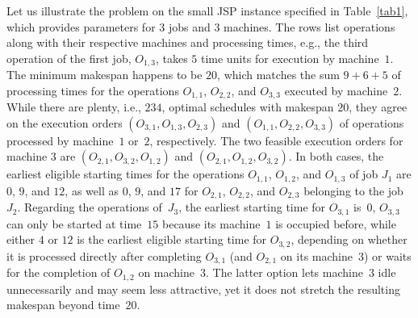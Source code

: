 \documentclass[runningheads]{llncs}
\begin{document}
Let us illustrate the problem on the small JSP instance specified in Table~\ref{tab1}, which provides parameters for $3$ jobs and $3$ machines. 
The rows list operations along with their respective machines and processing times, e.g., the third operation of the first job, $O_{1,3}$, takes $5$ time units for execution by machine~$1$.
The minimum makespan happens to be $20$, which matches the sum $9+6+5$ of processing times for the operations $O_{1,1}$, $O_{2,2}$, and $O_{3,3}$ executed by machine~$2$.
While there are plenty, i.e., $234$, optimal schedules with makespan $20$,
they agree on the execution orders $(O_{3,1}, O_{1,3}, O_{2,3})$ and $(O_{1,1}, O_{2,2}, O_{3,3})$
of operations processed by machine~$1$ or~$2$, respectively.
The two feasible execution orders for machine $3$ are
$(O_{2,1}, O_{3,2}, O_{1,2})$ and
$(O_{2,1}, O_{1,2}, O_{3,2})$.
In both cases, the earliest eligible starting times for the operations
$O_{1,1}$, $O_{1,2}$, and $O_{1,3}$ of job $J_1$ are
$0$, $9$, and $12$,
as well as
$0$, $9$, and $17$ for $O_{2,1}$, $O_{2,2}$, and $O_{2,3}$
belonging to the job~$J_2$.
Regarding the operations of~$J_3$,
the earliest starting time for $O_{3,1}$ is~$0$,
$O_{3,3}$ can only be started at time~$15$ because its machine~$1$
is occupied before,
while either $4$ or $12$ is the earliest eligible starting time for $O_{3,2}$,
depending on whether it is processed directly after completing $O_{3,1}$
(and $O_{2,1}$ on its machine~$3$) or waits for the completion of $O_{1,2}$
on machine~$3$.
The latter option lets machine~$3$ idle unnecessarily 
and may seem less attractive,
yet it does not stretch the resulting makespan beyond time~$20$. 
%
%
\end{document}
